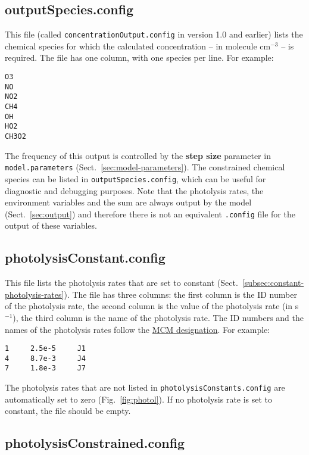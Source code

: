 \subsection{outputSpecies.config} \label{subsec:outputspecies}

This file (called \texttt{concentrationOutput.config} in version 1.0
and earlier) lists the chemical species for which the calculated
concentration -- in molecule cm$^{-3}$ -- is required. The file has
one column, with one species per line. For example:

\begin{verbatim}
O3
NO
NO2
CH4
OH
HO2
CH3O2
\end{verbatim}

The frequency of this output is controlled by the \textbf{step size}
parameter in \texttt{model.parameters} (Sect.~\ref{sec:model-parameters}).
The constrained chemical species can be listed in
\texttt{outputSpecies.config}, which can be useful for diagnostic and
debugging purposes. Note that the photolysis rates, the environment
variables and the  sum are always output by the model
(Sect.~\ref{sec:output}) and therefore there is not an equivalent
\texttt{.config} file for the output of these variables.

\subsection{photolysisConstant.config} \label{subsec:photolysisconstant}

This file lists the photolysis rates that are set to constant
(Sect.~\ref{subsec:constant-photolysis-rates}). The file has three
columns: the first column is the ID number of the photolysis rate, the
second column is the value of the photolysis rate (in s$^{-1}$), the
third column is the name of the photolysis rate. The ID numbers and
the names of the photolysis rates follow the
\href{https://mcm.york.ac.uk/MCM/rates/photolysis}{MCM designation}.
For example:

\begin{verbatim}
1     2.5e-5     J1
4     8.7e-3     J4
7     1.8e-3     J7
\end{verbatim}

The photolysis rates that are not listed in
\texttt{photolysisConstants.config} are automatically set to zero
(Fig.~\ref{fig:photol}). If no photolysis rate is set to constant, the
file should be empty.

\subsection{photolysisConstrained.config} \label{subsec:photolysisconstrained}


